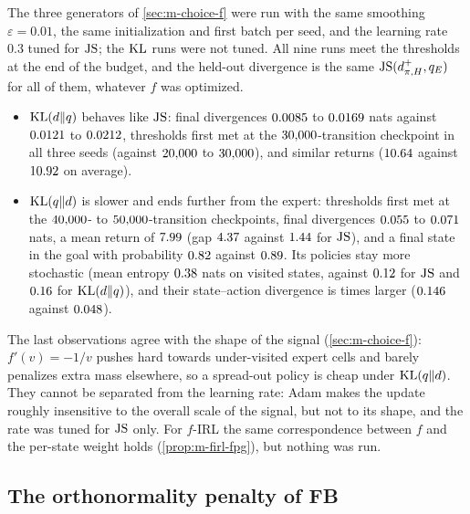 The three generators of \cref{sec:m-choice-f} were run with the same smoothing $\varepsilon=0.01$, the same initialization and first batch per seed, and the learning rate $0.3$ tuned for $\JS$; the $\KL$ runs were not tuned.
All nine runs meet the thresholds at the end of the budget, and the held-out divergence is the same $\JS(d^+_{\pi,H},q_E)$ for all of them, whatever $f$ was optimized.
\begin{itemize}[nosep]
\item $\KL(d\Vert q)$ behaves like $\JS$: final divergences $\vn{s13.kldq.js.lo}{0.0085}$ to $\vn{s13.kldq.js.hi}{0.0169}$ nats against $\vn{s13.js.js.lo}{0.0121}$ to $\vn{s13.js.js.hi}{0.0212}$, thresholds first met at the $\vn{s13.kldq.first30}{30{,}000}$-transition checkpoint in all three seeds (against $\vn{s13.js.first.lo}{20{,}000}$ to $\vn{s13.js.first.hi}{30{,}000}$), and similar returns ($\vn{s13.kldq.ret}{10.64}$ against $\vn{s13.js.ret}{10.92}$ on average).
\item $\KL(q\Vert d)$ is slower and ends further from the expert: thresholds first met at the $\vn{s09.klqd.first.lo}{40{,}000}$- to $\vn{s09.klqd.first.hi}{50{,}000}$-transition checkpoints, final divergences $\vn{s13.klqd.js.lo}{0.055}$ to $\vn{s13.klqd.js.hi}{0.071}$ nats, a mean return of $\vn{s13.klqd.ret}{7.99}$ (gap $\vn{s13.klqd.gap}{4.37}$ against $\vn{s13.js.gap}{1.44}$ for $\JS$), and a final state in the goal with probability $\vn{s13.klqd.fig}{0.82}$ against $\vn{s13.js.fig}{0.89}$. Its policies stay more stochastic (mean entropy $\vn{s13.klqd.ent}{0.38}$ nats on visited states, against $\vn{s13.js.ent}{0.12}$ for $\JS$ and $\vn{s13.kldq.ent}{0.16}$ for $\KL(d\Vert q)$), and their state--action divergence is  times larger ($\vn{s13.klqd.jssa}{0.146}$ against $\vn{s13.js.jssa}{0.048}$).
\end{itemize}
The last observations agree with the shape of the signal (\cref{sec:m-choice-f}): $f'(v)=-1/v$ pushes hard towards under-visited expert cells and barely penalizes extra mass elsewhere, so a spread-out policy is cheap under $\KL(q\Vert d)$.
They cannot be separated from the learning rate: Adam makes the update roughly insensitive to the overall scale of the signal, but not to its shape, and the rate was tuned for $\JS$ only.
For $f$-IRL the same correspondence between $f$ and the per-state weight holds (\cref{prop:m-firl-fpg}), but nothing was run.

\subsection{The orthonormality penalty of FB}

